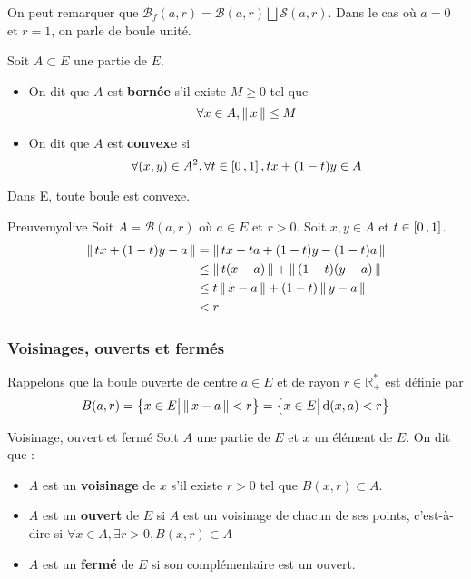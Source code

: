     On peut remarquer que $\mathcal{B}_f(a,r) = \mathcal{B}(a,r) \bigsqcup \mathcal{S}(a,r)$. Dans le cas où $a = 0$ et $r = 1$, on parle de boule unité.

    \begin{defi}{}{}
        Soit $A \subset E$ une partie de $E$. 
        \begin{itemize}
            \item On dit que $A$ est \textbf{bornée} s’il existe $M \geq 0$ tel que 
            \[ \forall x \in A, \left\lVert\,x\,\right\rVert \leq M \]    
            \item On dit que $A$ est \textbf{convexe} si 
            \[ \forall (x,y) \in A^2, \forall t \in \left[ 0 \, , 1 \right], tx + (1-t)y \in A \]  
        \end{itemize}
    \end{defi}

    \begin{prop}{}{}
        Dans E, toute boule est convexe.
    \end{prop}

    \begin{demo}{Preuve}{myolive}
        Soit $A = \mathcal{B}(a,r)$ où $a \in E$ et $r > 0$. Soit $x,y \in A$ et $t \in \left[ 0 \, , 1 \right]$.
        \begin{align*}
            \left\lVert\,tx + (1-t)y - a\,\right\rVert 
            &= \left\lVert\,tx -ta + (1 - t)y - (1-t)a\,\right\rVert \\
            &\leq \left\lVert\,t(x-a)\,\right\rVert + \left\lVert\,(1-t)(y-a)\,\right\rVert \\
            &\leq t\left\lVert\,x-a\,\right\rVert + (1-t)\left\lVert\,y-a\,\right\rVert \\
            &< r
        \end{align*}
    \end{demo}

    \subsubsection{Voisinages, ouverts et fermés}

    Rappelons que la boule ouverte de centre $a \in E$ et de rayon $r \in \mathbb{R}_+^*$ est définie par 
    \[ B(a,r) = \big\{ x \in E \big| \left\lVert\,x - a\,\right\rVert < r \big\} = \big\{ x \in E \big| \operatorname{d}(x,a) < r \big\} \] 

    \begin{defi}{Voisinage, ouvert et fermé}{}
        Soit $A$ une partie de $E$ et $x$ un élément de $E$. On dit que :
        \begin{itemize}
            \item $A$ est un \textbf{voisinage} de $x$ s’il existe $r > 0$ tel que $B(x,r) \subset A$.
            \item $A$ est un \textbf{ouvert} de $E$ si $A$ est un voisinage de chacun de ses points, c’est-à-dire si $ \forall x \in A, \exists r > 0, B(x,r) \subset A$ 
            \item $A$ est un \textbf{fermé} de $E$ si son complémentaire est un ouvert.
        \end{itemize}
    \end{defi}

